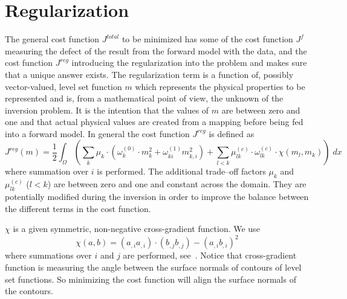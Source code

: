\chapter{Regularization}\label{Chp:ref:regularization}

The general cost function $J^{total}$ to be minimized has some of the cost
function $J^f$ measuring the defect of the result from the
forward model with the data, and the cost function $J^{reg}$ introducing the
regularization into the problem and makes sure that a unique answer exists.
The regularization term is a function of, possibly vector-valued, level set
function $m$ which represents the physical properties to be represented and is,
from a mathematical point of view, the unknown of the inversion problem.
It is the intention that the values of $m$ are between zero and one and that
actual physical values are created from a mapping before being fed into a
forward model. In general the cost function $J^{reg}$ is defined as 
\begin{equation}\label{EQU:REG:1}
J^{reg}(m) = \frac{1}{2} \int_{\Omega} \left(
 \sum_{k} \mu_k \cdot ( \omega^{(0)}_k \cdot m_k^2 + \omega^{(1)}_{ki}m_{k,i}^2 ) 
+  \sum_{l<k} \mu^{(c)}_{lk} \cdot \omega^{(c)}_{lk}  \cdot  \chi(m_l,m_k) \right) \; dx 
\end{equation} 
where summation over $i$ is performed. The additional trade--off factors 
$\mu_k$ and $\mu^{(c)}_{lk}$ ($l<k$) are between zero and one and constant across the 
domain. They are potentially modified during the inversion in order to improve the balance between the different terms 
in the cost function.

$\chi$ is a given symmetric, non-negative cross-gradient function. We use
\begin{equation}\label{EQU:REG:4}
 \chi(a,b) =  ( a_{,i} a_{,i}) \cdot ( b_{,j} b_{,j}) -   ( a_{,i} b_{,i})^2 
\end{equation} 
where summations over $i$ and $j$  are performed, see~\cite{GALLARDO2005a}. Notice that cross-gradient function
is measuring the angle between the surface normals of contours of level set functions. So 
minimizing the cost function will align the surface normals of the contours.

